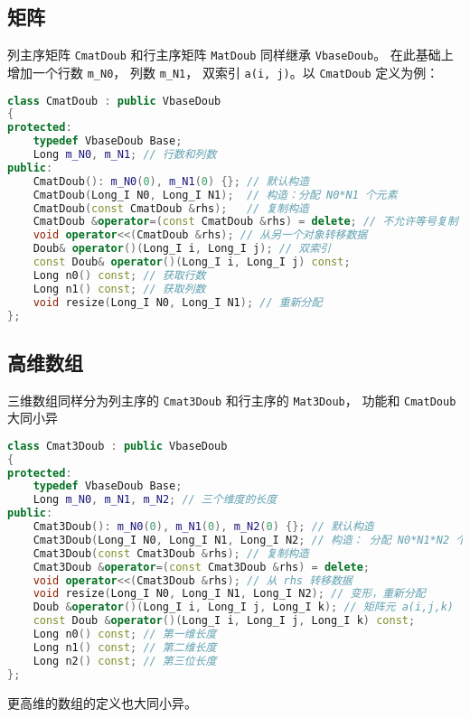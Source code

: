 \subsection{矩阵}
列主序矩阵 \verb|CmatDoub| 和行主序矩阵 \verb|MatDoub| 同样继承 \verb|VbaseDoub|。 在此基础上增加一个行数 \verb|m_N0|， 列数 \verb|m_N1|， 双索引 \verb|a(i, j)|。以 \verb|CmatDoub| 定义为例：
\begin{lstlisting}[language=cpp]
class CmatDoub : public VbaseDoub
{
protected:
    typedef VbaseDoub Base;
    Long m_N0, m_N1; // 行数和列数
public:
    CmatDoub(): m_N0(0), m_N1(0) {}; // 默认构造
    CmatDoub(Long_I N0, Long_I N1);  // 构造：分配 N0*N1 个元素
    CmatDoub(const CmatDoub &rhs);   // 复制构造
    CmatDoub &operator=(const CmatDoub &rhs) = delete; // 不允许等号复制
    void operator<<(CmatDoub &rhs); // 从另一个对象转移数据
    Doub& operator()(Long_I i, Long_I j); // 双索引
    const Doub& operator()(Long_I i, Long_I j) const;
    Long n0() const; // 获取行数
    Long n1() const; // 获取列数
    void resize(Long_I N0, Long_I N1); // 重新分配
};
\end{lstlisting}

\subsection{高维数组}
三维数组同样分为列主序的 \verb|Cmat3Doub| 和行主序的 \verb|Mat3Doub|， 功能和 \verb|CmatDoub| 大同小异
\begin{lstlisting}[language=cpp]
class Cmat3Doub : public VbaseDoub
{
protected:
    typedef VbaseDoub Base;
    Long m_N0, m_N1, m_N2; // 三个维度的长度
public:
    Cmat3Doub(): m_N0(0), m_N1(0), m_N2(0) {}; // 默认构造
    Cmat3Doub(Long_I N0, Long_I N1, Long_I N2; // 构造： 分配 N0*N1*N2 个元素
    Cmat3Doub(const Cmat3Doub &rhs); // 复制构造
    Cmat3Doub &operator=(const Cmat3Doub &rhs) = delete;
    void operator<<(Cmat3Doub &rhs); // 从 rhs 转移数据
    void resize(Long_I N0, Long_I N1, Long_I N2); // 变形，重新分配
    Doub &operator()(Long_I i, Long_I j, Long_I k); // 矩阵元 a(i,j,k)
    const Doub &operator()(Long_I i, Long_I j, Long_I k) const;
    Long n0() const; // 第一维长度
    Long n1() const; // 第二维长度
    Long n2() const; // 第三位长度
};
\end{lstlisting}

更高维的数组的定义也大同小异。
